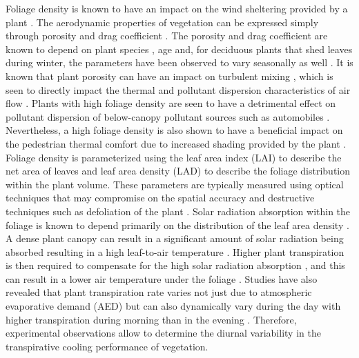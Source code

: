 Foliage density is known to have an impact on the wind sheltering provided by a plant \citep{Bitog2012b,Bitog2011b,Guan2003,Manickathan2018b}. The aerodynamic properties of vegetation can be expressed simply through porosity and drag coefficient \citep{Grant1998,Guan2003,Manickathan2018b}. The porosity and drag coefficient are known to depend on plant species \citep{Cao2012,Manickathan2018b,Rudnicki2004,Vollsinger2005}, age \citep{Dahle2010} and, for deciduous plants that shed leaves during winter, the parameters have been observed to vary seasonally as well \citep{Dellwik2019,Hwang2011,Maass1995}. It is known that plant porosity can have an impact on turbulent mixing \citep{Bai2012,Hiraoka2008,Manickathan2018b,McClure2017}, which is seen to directly impact the thermal and pollutant dispersion characteristics of air flow \citep{Conan2015,Gromke2008,Gromke2015c,Gromke2008a}. Plants with high foliage density are seen to have a detrimental effect on pollutant dispersion of below-canopy pollutant sources such as automobiles \citep{Nowak2006}. Nevertheless, a high foliage density is also shown to have a beneficial impact on the pedestrian thermal comfort due to increased shading provided by the plant \citep{Hwang2011,Morakinyo2017,Ng2012}. Foliage density is parameterized using the leaf area index (LAI) to describe the net area of leaves and leaf area density (LAD) to describe the foliage distribution within the plant volume. These parameters are typically measured using optical techniques \citep{Cao2012,Grant1998,Guan2003,Liu2018,Manickathan2018b,Phattaralerphong2005} that may compromise on the spatial accuracy and destructive techniques such as defoliation of the plant \citep{Jonckheere2004,ONeal2002}. Solar radiation absorption within the foliage is known to depend primarily on the distribution of the leaf area density \citep{Kichah2012,Manickathan2018a,Park2018}.  A dense plant canopy can result in a significant amount of solar radiation being absorbed resulting in a high leaf-to-air temperature \citep{Hiraoka2005,Leuzinger2007,Manickathan2018a}. Higher plant transpiration is then required to compensate for the high solar radiation absorption \citep{Manickathan2018b}, and this can result in a lower air temperature under the foliage \citep{Wong2003}. Studies have also revealed that plant transpiration rate varies not just due to atmospheric evaporative demand (AED) \citep{Kichah2012,Manickathan2018a,McVicar2012,Tuzet2003} but can also dynamically vary during the day with higher transpiration during morning than in the evening \citep{Huang2017,Tuzet2003}. Therefore, experimental observations allow to determine the diurnal variability in the transpirative cooling performance of vegetation.

